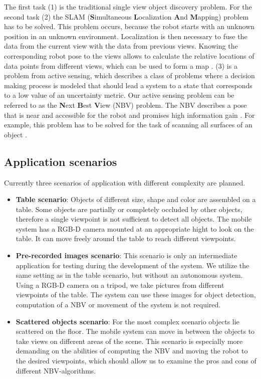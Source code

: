 \documentclass[a4paper,11pt,english]{article}
\begin{document}
The first task (1) is the traditional single view object discovery problem. 
For the second task (2) the SLAM (\textbf{S}imultaneous \textbf{L}ocalization \textbf{A}nd \textbf{M}apping) problem has to be solved.
This problem occurs, because the robot starts with an unknown position in an unknown environment. 
Localization is then necessary to fuse the data from the current view with the data from previous views. 
Knowing the corresponding robot pose to the views allows to calculate the relative locations of data points from different views, which can be used to form a map \cite{surmann2003autonomous}. 
(3) is a problem from active sensing, which describes a class of problems where a decision making process is modeled that should lead a system to a state that corresponds to a low value of an uncertainty metric.
Our active sensing problem can be referred to as the \textbf{N}ext \textbf{B}est \textbf{V}iew (NBV) problem.
The NBV describes a pose that is near and accessible for the robot and promises high information gain \cite{surmann2003autonomous}.
For example, this problem has to be solved for the task of scanning all surfaces of an object \cite{pito1999solution}.

\subsection{Application scenarios}
Currently three scenarios of application with different complexity are planned.
\begin{itemize}	
	\item \textbf{Table scenario}: Objects of different size, shape and color are assembled on a table. Some objects are partially or completely occluded by other objects, therefore a single viewpoint is not sufficient to detect all objects. The mobile system has a RGB-D camera mounted at an appropriate hight to look on the table. It can move freely around the table to reach different viewpoints.
	\item \textbf{Pre-recorded images scenario}: This scenario is only an intermediate application for testing during the development of the system. We utilize the same setting as in the table scenario, but without an autonomous system. Using a RGB-D camera on a tripod, we take pictures from different viewpoints of the table. The system can use these images for object detection, computation of a NBV or movement of the system is not required.
	\item \textbf{Scattered objects scenario}: For the most complex scenario objects lie scattered on the floor. The mobile system can move in between the objects to take views on different areas of the scene. This scenario is especially more demanding on the abilities of computing the NBV and moving the robot to the desired viewpoints, which should allow us to examine the pros and cons of different NBV-algorithms.
\end{itemize} 
\end{document}
